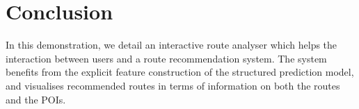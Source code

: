 \section{Conclusion}
In this demonstration, we detail an interactive route analyser which helps the interaction between users and a route recommendation system.
The system benefits from the explicit feature construction of the structured prediction model, and visualises recommended routes in terms of information on both the routes and the POIs.

